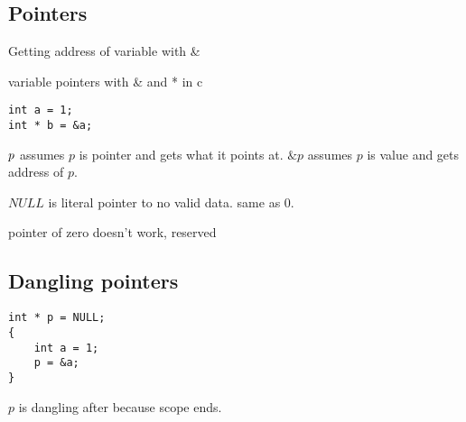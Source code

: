 
\subsection{Pointers}
Getting address of variable with \&


variable pointers with \& and * in c

\begin{verbatim}
int a = 1;
int * b = &a;
\end{verbatim}
\(\*p\) assumes \(p\) is pointer and gets what it points at. \(\&p\) assumes \(p\) is value and gets address of \(p\).


\(NULL\) is literal pointer to no valid data. same as \(0\).

pointer of zero doesn't work, reserved

\subsection{Dangling pointers}

\begin{verbatim}
int * p = NULL;
{
	int a = 1;
	p = &a;
}
\end{verbatim}

\(p\) is dangling after because scope ends.

